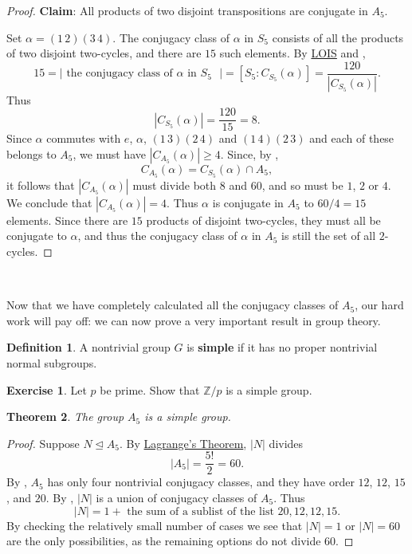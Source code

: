 \documentclass[12pt]{report}
\newtheorem{theorem}{Theorem}[chapter]
\numberwithin{equation}{section}
\numberwithin{theorem}{chapter}
\theoremstyle{definition}
\newtheorem{definition}[theorem]{Definition}
\newtheorem{exercise}{Exercise}
\newtheorem*{basic properties}{Basic Properties}
\newtheorem*{Important Remark}{Important Remark}
\newcommand{\Z}{\mathbb{Z}}
\def\norm{\mathrel{\unlhd}}
\begin{document}
\begin{proof}
\vspace{1.5em}

{\bf Claim}: All products of two disjoint transpositions are conjugate in $A_5$.

\vspace{0.5em}


Set $\alpha = (1 \, 2)(3 \, 4)$. The conjugacy class of $\alpha$ in $S_5$ consists of all the products of two disjoint two-cycles, and there are $15$ such elements. By \hyperref[lois]{LOIS} and ,
$$15 = |\text{ the conjugacy class of $\alpha$ in $S_5$ }|
= [S_5: C_{S_5}(\alpha)]=\frac{120}{\left|C_{S_5}(\alpha)\right|}.$$
Thus
$$\left|C_{S_5}(\alpha)\right| = \frac{120}{15} = 8.$$
Since $\alpha$ commutes with $e$, $\alpha$, $(1 \, 3)(2 \, 4)$ and $(1 \, 4)(2 \, 3)$ and each of these belongs to $A_5$, we must have $|C_{A_5}(\alpha)| \geqslant 4$.
Since, by ,
$$C_{A_5}(\alpha) = C_{S_5}(\alpha) \cap A_5,$$
it follows that $|C_{A_5}(\alpha)|$ must divide both $8$ and $60$, and so must be $1$, $2$ or $4$.  
We conclude that $|C_{A_5}(\alpha)| = 4$. Thus $\alpha$ is conjugate in $A_5$ to $60/4 = 15$ elements. Since there are $15$ products of disjoint two-cycles, they must all be conjugate to $\alpha$, and thus the conjugacy class of $\alpha$ in $A_5$ is still the set of all $2$-cycles.
\end{proof}


\

 Now that we have completely calculated all the conjugacy classes of $A_5$, our hard work will pay off: we can now prove a very important result in group theory.




\begin{definition}
	A nontrivial group $G$ is {\bf simple} if it has no proper nontrivial normal subgroups.
\end{definition}


\begin{exercise}
	Let $p$ be prime. Show that $\Z/p$ is a simple group.
\end{exercise}


\vspace{0.5em}


\begin{theorem}\label{A5 is simple}
The group $A_5$ is a simple group.
\end{theorem}

\begin{proof} 
Suppose $N \norm A_5$. By \hyperref[Lagrange]{Lagrange's Theorem}, $|N|$ divides 
$$|A_5| = \frac{5!}{2} = 60.$$ 
By , $A_5$ has only four nontrivial conjugacy classes, and they have order $12$, $12$, $15$, and $20$. By , $|N|$ is a union of conjugacy classes of $A_5$.
Thus
$$|N| = 1 + \text{ the sum of a sublist of the list $20, 12, 12, 15$}.$$
By checking the relatively small number of cases we see that $|N| = 1$ or $|N| = 60$ are the only possibilities, as the remaining options do not divide $60$.
\end{proof}
\end{document}
